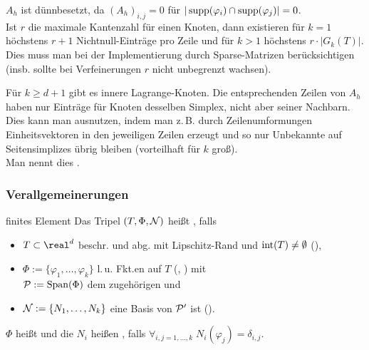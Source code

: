 \linie

\begin{Bem}
    $A_h$ ist dünnbesetzt,
    da $(A_h)_{i,j} = 0$ für $|\supp(\varphi_i) \cap \supp(\varphi_j)| = 0$.\\
    Ist $r$ die maximale Kantenzahl für einen Knoten,
    dann existieren für $k = 1$ höchstens $r + 1$ Nichtnull-Einträge pro Zeile und
    für $k > 1$ höchstens $r \cdot |G_k(T)|$.\\
    Dies muss man bei der Implementierung durch Sparse-Matrizen berücksichtigen
    (insb. sollte bei Verfeinerungen $r$ nicht unbegrenzt wachsen).
\end{Bem}

\begin{Bem}
    Für $k \ge d+1$ gibt es innere Lagrange-Knoten.
    Die entsprechenden Zeilen von $A_h$ haben nur Einträge für Knoten desselben Simplex,
    nicht aber seiner Nachbarn.
    Dies kann man ausnutzen, indem man z.\,B. durch Zeilenumformungen Einheitsvektoren
    in den jeweiligen Zeilen erzeugt und so nur Unbekannte auf Seitensimplizes übrig bleiben
    (vorteilhaft für $k$ groß).\\
    Man nennt dies .
\end{Bem}

\pagebreak

\subsubsection{%
    Verallgemeinerungen%
}

\begin{Def}{finites Element}
    Das Tripel $(T, \Phi, \N)$ heißt , falls
    \begin{itemize}
        \item
        $T \subset \real^d$ beschr. und abg. mit Lipschitz-Rand und $\interior(T) \not= \emptyset$
        (),

        \item
        $\Phi := \{\varphi_1, \dotsc, \varphi_k\}$ l.\,u. Fkt.en auf $T$
        (, ) mit\\
        $\P := \Span(\Phi)$ dem zugehörigen  und

        \item
        $\N := \{N_1, \dotsc, N_k\}$
        eine Basis von $\P'$ ist ().
    \end{itemize}
    $\Phi$ heißt  und die $N_i$ heißen ,
    falls $\forall_{i,j=1,\dotsc,k}\; N_i(\varphi_j) = \delta_{i,j}$.
\end{Def}

